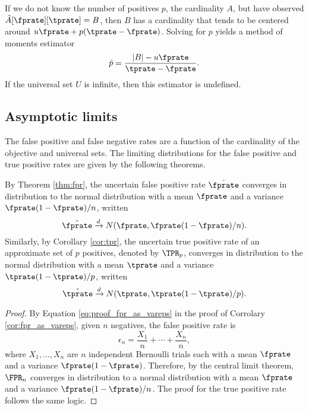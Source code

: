 \documentclass[
]{article}
\begin{document}
If we do not know the number of positives \(p\), the cardinality \(A\),
but have observed \(\hat A[\fprate][\tprate] = B\), then \(B\) has a
cardinality that tends to be centered around
\(u \fprate + p (\tprate - \fprate)\). Solving for \(p\) yields a method
of moments estimator \begin{equation}
    \hat p = \frac{|B| - u \fprate}{\tprate - \fprate}.
\end{equation} If the universal set \(U\) is infinite, then this
estimator is undefined.

\subsection{Asymptotic limits}
\label{sec:asymtotic}

The false positive and false negative rates are a function of the
cardinality of the objective and universal sets. The limiting
distributions for the false positive and true positive rates are given
by the following theorems.

\begin{theorem}
\label{thm:approxfpr}
    By Theorem \ref{thm:fpr}, the uncertain false positive rate $\hat\fprate$ converges in
    distribution to the normal distribution with a mean $\fprate$ and a 
    variance $\fprate(1-\fprate)/n$, written
    \begin{equation}
    \label{eq:approxfpr}
        \hat\fprate \xrightarrow{d} N(\fprate, \fprate(1-\fprate) / n).
    \end{equation}
    Similarly, by Corollary \ref{cor:tpr}, the uncertain true positive rate of an approximate  set of $p$ positives, denoted by $\TPR_p$, converges in distribution to the normal distribution with a mean $\tprate$ and a variance $\tprate(1-\tprate)/p$, written
    \begin{equation}
    \label{eq:approxtpr}
        \hat\tprate \xrightarrow{d} N(\tprate, \tprate(1-\tprate) / p).
    \end{equation}
\end{theorem}
\begin{proof}
By Equation \ref{eq:proof_fpr_as_vareps} in the proof of Corrolary \ref{cor:fpr_as_vareps}, 
given 
$n$ negatives, the false positive rate is
$$
    \epsilon_n = \frac{X_1}{n} + \cdots + \frac{X_n}{n},
$$
where $X_1,\ldots,X_n$ are $n$ independent Bernoulli trials each with a mean $\fprate$ and a variance $\fprate(1-\fprate)$.
Therefore, by the central limit theorem, $\FPR_n$ converges in distribution to a normal distribution with a mean $\fprate$  and a variance $\fprate(1-\fprate)/n$.
The proof for the true positive rate follows the same logic.
\end{proof}
\end{document}
